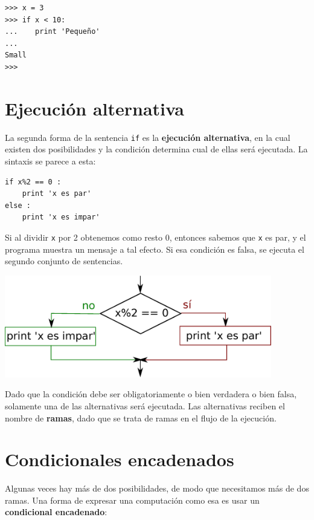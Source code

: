 \beforeverb
\begin{verbatim}
>>> x = 3
>>> if x < 10:
...    print 'Pequeño'
... 
Small
>>>
\end{verbatim}
\afterverb
%

\section{Ejecución alternativa}
\label{alternative execution}


La segunda forma de la sentencia {\tt if} es la {\bf ejecución alternativa},
en la cual existen dos posibilidades y la condición determina
cual de ellas será ejecutada. La sintaxis se parece a esta:

\beforeverb
\begin{verbatim}
if x%2 == 0 :
    print 'x es par'
else :
    print 'x es impar'
\end{verbatim}
\afterverb
%
Si al dividir {\tt x} por 2 obtenemos como resto 0, entonces sabemos
que {\tt x} es par, y el programa muestra un mensaje a tal
efecto. Si esa condición es falsa, se ejecuta el segundo
conjunto de sentencias.

\beforefig
\centerline{\includegraphics[height=1.75in]{figs2/if-else.eps}}
\afterfig

Dado que la condición debe ser obligatoriamente o bien verdadera o bien falsa, solamente una de
las alternativas será ejecutada. Las alternativas reciben el nombre de
{\bf ramas}, dado que se trata de ramas en el flujo de la ejecución.


\section{Condicionales encadenados}

Algunas veces hay más de dos posibilidades, de modo que necesitamos más
de dos ramas. Una forma de expresar una computación como esa es usar un
{\bf condicional encadenado}:

